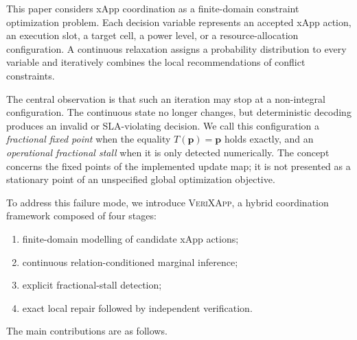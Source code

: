 \documentclass[pdflatex,sn-mathphys-num,iicol,oneside]{sn-jnl}
\newcommand{\method}{\textsc{VeriXApp}}
\begin{document}
This paper considers xApp coordination as a finite-domain constraint
optimization problem. Each decision variable represents an accepted
xApp action, an execution slot, a target cell, a power level, or a
resource-allocation configuration. A continuous relaxation assigns a
probability distribution to every variable and iteratively combines
the local recommendations of conflict constraints.

The central observation is that such an iteration may stop at a
non-integral configuration. The continuous state no longer changes,
but deterministic decoding produces an invalid or SLA-violating
decision. We call this configuration a \emph{fractional fixed point}
when the equality $T(\bm{p})=\bm{p}$ holds exactly, and an
\emph{operational fractional stall} when it is only detected
numerically. The concept concerns the fixed points of the
implemented update map; it is not presented as a stationary point of
an unspecified global optimization objective.

To address this failure mode, we introduce \method, a hybrid
coordination framework composed of four stages:

\begin{enumerate}
    \item finite-domain modelling of candidate xApp actions;
    \item continuous relation-conditioned marginal inference;
    \item explicit fractional-stall detection;
    \item exact local repair followed by independent verification.
\end{enumerate}

The main contributions are as follows.
\end{document}
